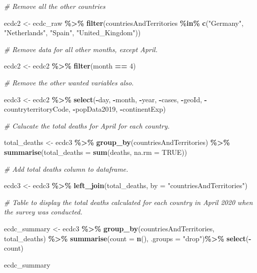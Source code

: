 \documentclass[
]{article}
\newenvironment{Shaded}{\begin{snugshade}}{\end{snugshade}}
\newcommand{\AttributeTok}[1]{\textcolor[rgb]{0.13,0.29,0.53}{#1}}
\newcommand{\CommentTok}[1]{\textcolor[rgb]{0.56,0.35,0.01}{\textit{#1}}}
\newcommand{\ConstantTok}[1]{\textcolor[rgb]{0.56,0.35,0.01}{#1}}
\newcommand{\DecValTok}[1]{\textcolor[rgb]{0.00,0.00,0.81}{#1}}
\newcommand{\FunctionTok}[1]{\textcolor[rgb]{0.13,0.29,0.53}{\textbf{#1}}}
\newcommand{\NormalTok}[1]{#1}
\newcommand{\OtherTok}[1]{\textcolor[rgb]{0.56,0.35,0.01}{#1}}
\newcommand{\SpecialCharTok}[1]{\textcolor[rgb]{0.81,0.36,0.00}{\textbf{#1}}}
\newcommand{\StringTok}[1]{\textcolor[rgb]{0.31,0.60,0.02}{#1}}
\begin{document}
\begin{Shaded}
\begin{Highlighting}[]
\CommentTok{\# Remove all the other countries}

\NormalTok{ecdc2 }\OtherTok{\textless{}{-}}\NormalTok{ ecdc\_raw }\SpecialCharTok{\%\textgreater{}\%} 
  \FunctionTok{filter}\NormalTok{(countriesAndTerritories }\SpecialCharTok{\%in\%} \FunctionTok{c}\NormalTok{(}\StringTok{"Germany"}\NormalTok{, }\StringTok{"Netherlands"}\NormalTok{, }\StringTok{"Spain"}\NormalTok{, }\StringTok{"United\_Kingdom"}\NormalTok{))}

\CommentTok{\# Remove data for all other months, except April. }

\NormalTok{ecdc2 }\OtherTok{\textless{}{-}}\NormalTok{ ecdc2 }\SpecialCharTok{\%\textgreater{}\%} 
  \FunctionTok{filter}\NormalTok{(month }\SpecialCharTok{==} \DecValTok{4}\NormalTok{)}

\CommentTok{\# Remove the other wanted variables also. }

\NormalTok{ecdc3 }\OtherTok{\textless{}{-}}\NormalTok{ ecdc2 }\SpecialCharTok{\%\textgreater{}\%} 
  \FunctionTok{select}\NormalTok{(}\SpecialCharTok{{-}}\NormalTok{day, }\SpecialCharTok{{-}}\NormalTok{month, }\SpecialCharTok{{-}}\NormalTok{year, }\SpecialCharTok{{-}}\NormalTok{cases, }\SpecialCharTok{{-}}\NormalTok{geoId, }\SpecialCharTok{{-}}\NormalTok{countryterritoryCode, }\SpecialCharTok{{-}}\NormalTok{popData2019, }\SpecialCharTok{{-}}\NormalTok{continentExp)}

\CommentTok{\# Calucate the total deaths for April for each country.}

\NormalTok{total\_deaths }\OtherTok{\textless{}{-}}\NormalTok{ ecdc3 }\SpecialCharTok{\%\textgreater{}\%} 
  \FunctionTok{group\_by}\NormalTok{(countriesAndTerritories) }\SpecialCharTok{\%\textgreater{}\%} 
  \FunctionTok{summarise}\NormalTok{(}\AttributeTok{total\_deaths =} \FunctionTok{sum}\NormalTok{(deaths, }\AttributeTok{na.rm =} \ConstantTok{TRUE}\NormalTok{))}

\CommentTok{\# Add total deaths column to dataframe.}

\NormalTok{ecdc3 }\OtherTok{\textless{}{-}}\NormalTok{ ecdc3 }\SpecialCharTok{\%\textgreater{}\%} 
  \FunctionTok{left\_join}\NormalTok{(total\_deaths, }\AttributeTok{by =} \StringTok{"countriesAndTerritories"}\NormalTok{)}


\CommentTok{\# Table to display the total deaths calculated for each country in April 2020 when the survey was conducted. }

\NormalTok{ecdc\_summary }\OtherTok{\textless{}{-}}\NormalTok{ ecdc3 }\SpecialCharTok{\%\textgreater{}\%}
  \FunctionTok{group\_by}\NormalTok{(countriesAndTerritories, total\_deaths) }\SpecialCharTok{\%\textgreater{}\%}
  \FunctionTok{summarise}\NormalTok{(}\AttributeTok{count =} \FunctionTok{n}\NormalTok{(), }\AttributeTok{.groups =} \StringTok{"drop"}\NormalTok{)}\SpecialCharTok{\%\textgreater{}\%}
  \FunctionTok{select}\NormalTok{(}\SpecialCharTok{{-}}\NormalTok{count)}

\NormalTok{ecdc\_summary}
\end{Highlighting}
\end{Shaded}
\end{document}
